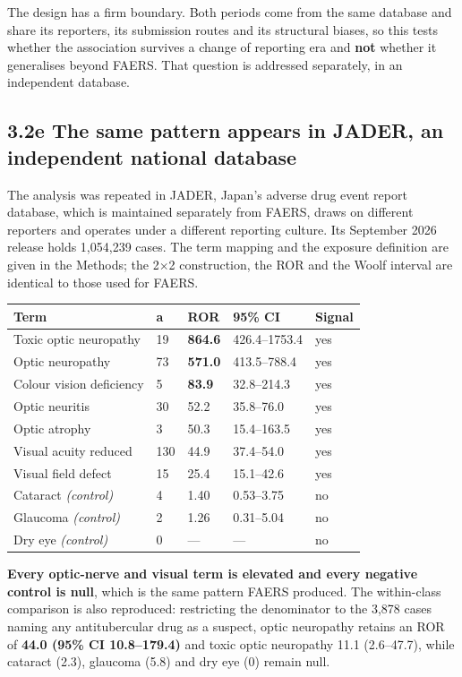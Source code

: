 \documentclass[utf8]{FrontiersinVancouver}
\begin{document}
The design has a firm boundary. Both periods come from the same database and share its reporters, its submission routes and its structural biases, so this tests whether the association survives a change of reporting era and \textbf{not} whether it generalises beyond FAERS. That question is addressed separately, in an independent database.

\subsection{3.2e The same pattern appears in JADER, an independent national database}

The analysis was repeated in JADER, Japan's adverse drug event report database, which is maintained separately from FAERS, draws on different reporters and operates under a different reporting culture. Its September 2026 release holds 1,054,239 cases. The term mapping and the exposure definition are given in the Methods; the 2$\times$2 construction, the ROR and the Woolf interval are identical to those used for FAERS.

\begin{table}[htbp]
\centering
\begin{tabular}{lllll}
\hline
Term & a & ROR & 95\% CI & Signal \\
\hline
Toxic optic neuropathy & 19 & \textbf{864.6} & 426.4--1753.4 & yes \\
Optic neuropathy & 73 & \textbf{571.0} & 413.5--788.4 & yes \\
Colour vision deficiency & 5 & \textbf{83.9} & 32.8--214.3 & yes \\
Optic neuritis & 30 & 52.2 & 35.8--76.0 & yes \\
Optic atrophy & 3 & 50.3 & 15.4--163.5 & yes \\
Visual acuity reduced & 130 & 44.9 & 37.4--54.0 & yes \\
Visual field defect & 15 & 25.4 & 15.1--42.6 & yes \\
Cataract \textit{(control)} & 4 & 1.40 & 0.53--3.75 & no \\
Glaucoma \textit{(control)} & 2 & 1.26 & 0.31--5.04 & no \\
Dry eye \textit{(control)} & 0 & --- & --- & no \\
\hline
\end{tabular}
\end{table}

\textbf{Every optic-nerve and visual term is elevated and every negative control is null}, which is the same pattern FAERS produced. The within-class comparison is also reproduced: restricting the denominator to the 3,878 cases naming any antitubercular drug as a suspect, optic neuropathy retains an ROR of \textbf{44.0 (95\% CI 10.8--179.4)} and toxic optic neuropathy 11.1 (2.6--47.7), while cataract (2.3), glaucoma (5.8) and dry eye (0) remain null.
\end{document}
